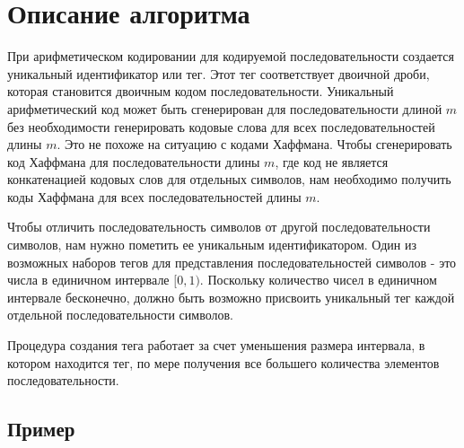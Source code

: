 \section*{Описание алгоритма}

При арифметическом кодировании для кодируемой последовательности 
создается уникальный идентификатор или тег. Этот тег соответствует
двоичной дроби, которая становится двоичным кодом последовательности.
Уникальный арифметический код может быть сгенерирован для
последовательности длиной $m$ без необходимости генерировать кодовые
слова для всех последовательностей длины $m$. Это не похоже на ситуацию
с кодами Хаффмана. Чтобы сгенерировать код Хаффмана для
последовательности длины $m$, где код не является конкатенацией кодовых
слов для отдельных символов, нам необходимо получить коды Хаффмана для
всех последовательностей длины $m$.

Чтобы отличить последовательность символов от другой последовательности
символов, нам нужно пометить ее уникальным идентификатором. Один из
возможных наборов тегов для представления последовательностей символов -
это числа в единичном интервале $[0,1)$. Поскольку количество чисел в
единичном интервале бесконечно, должно быть возможно присвоить
уникальный тег каждой отдельной последовательности символов.

Процедура создания тега работает за счет уменьшения размера интервала,
в котором находится тег, по мере получения все большего количества
элементов последовательности.

\pagebreak

\subsection*{Пример}

